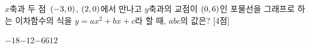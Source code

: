 $x$축과 두 점~$(-3{,}\mkern3mu 0)$, $(2{,}\mkern3mu 0)$에서 만나고 $y$축과의 교점이 $(0{,}\mkern3mu 6)$인 포물선을 그래프로 하는 이차함수의 식을 $y=ax^2+bx+c$라 할 때, $abc$의 값은?  \mbox{[4점]}
\begin{choices32}{$-18$}{$-12$}{$-6$}{$6$}{$12$}\end{choices32}
